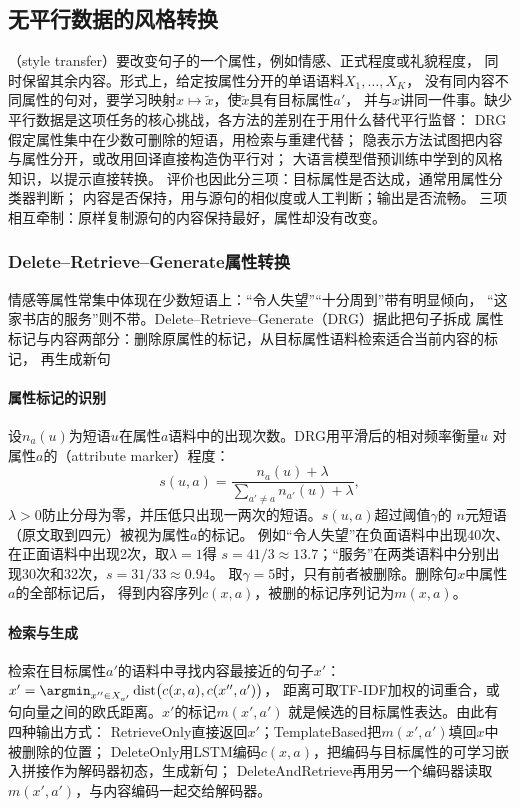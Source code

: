 \subsection{无平行数据的风格转换}
\label{sec:nlp-generation-style-transfer}

（style transfer）要改变句子的一个属性，例如情感、正式程度或礼貌程度，
同时保留其余内容。形式上，给定按属性分开的单语语料$X_1,\ldots,X_K$，
没有同内容不同属性的句对，要学习映射$x\mapsto\tilde x$，使$\tilde x$具有目标属性$a'$，
并与$x$讲同一件事。缺少平行数据是这项任务的核心挑战，各方法的差别在于用什么替代平行监督：
DRG假定属性集中在少数可删除的短语，用检索与重建代替；
隐表示方法试图把内容与属性分开，或改用回译直接构造伪平行对；
大语言模型借预训练中学到的风格知识，以提示直接转换。
评价也因此分三项：目标属性是否达成，通常用属性分类器判断；
内容是否保持，用与源句的相似度或人工判断；输出是否流畅。
三项相互牵制：原样复制源句的内容保持最好，属性却没有改变。

\subsubsection{Delete--Retrieve--Generate属性转换}
\label{sec:nlp-generation-delete-retrieve}

情感等属性常集中体现在少数短语上：“令人失望”“十分周到”带有明显倾向，
“这家书店的服务”则不带。Delete--Retrieve--Generate（DRG）据此把句子拆成
属性标记与内容两部分：删除原属性的标记，从目标属性语料检索适合当前内容的标记，
再生成新句

\paragraph{属性标记的识别}
设$n_a(u)$为短语$u$在属性$a$语料中的出现次数。DRG用平滑后的相对频率衡量$u$
对属性$a$的（attribute marker）程度：
\begin{equation}
  s(u,a)=\frac{n_a(u)+\lambda}{\sum_{a'\neq a}n_{a'}(u)+\lambda},
  \label{eq:nlp-generation-drg-salience}
\end{equation}
$\lambda>0$防止分母为零，并压低只出现一两次的短语。$s(u,a)$超过阈值$\gamma$的
$n$元短语（原文取到四元）被视为属性$a$的标记。
例如“令人失望”在负面语料中出现40次、在正面语料中出现2次，取$\lambda=1$得
$s=41/3\approx13.7$；“服务”在两类语料中分别出现30次和32次，$s=31/33\approx0.94$。
取$\gamma=5$时，只有前者被删除。删除句$x$中属性$a$的全部标记后，
得到内容序列$c(x,a)$，被删的标记序列记为$m(x,a)$。

\paragraph{检索与生成}
检索在目标属性$a'$的语料中寻找内容最接近的句子$x'$：
$x'=\argmin_{x''\in X_{a'}}\operatorname{dist}\bigl(c(x,a),c(x'',a')\bigr)$，
距离可取TF-IDF加权的词重合，或句向量之间的欧氏距离。$x'$的标记$m(x',a')$
就是候选的目标属性表达。由此有四种输出方式：
RetrieveOnly直接返回$x'$；TemplateBased把$m(x',a')$填回$x$中被删除的位置；
DeleteOnly用LSTM编码$c(x,a)$，把编码与目标属性的可学习嵌入拼接作为解码器初态，生成新句；
DeleteAndRetrieve再用另一个编码器读取$m(x',a')$，与内容编码一起交给解码器。

